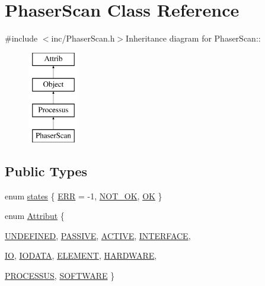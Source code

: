 \hypertarget{classPhaserScan}{
\section{PhaserScan Class Reference}
\label{classPhaserScan}
}


{\ttfamily \#include $<$inc/PhaserScan.h$>$}Inheritance diagram for PhaserScan::\begin{figure}[H]
\begin{center}
\leavevmode
\includegraphics[height=4cm]{classPhaserScan}
\end{center}
\end{figure}
\subsection*{Public Types}
\begin{DoxyCompactItemize}
\item 
enum \hyperlink{classProcessus_a36278773bd98f2d5612fea40c7774821}{states} \{ \hyperlink{classProcessus_a36278773bd98f2d5612fea40c7774821adaf73ad5d0a09f952d0f18dbbe1c7493}{ERR} = -\/1, 
\hyperlink{classProcessus_a36278773bd98f2d5612fea40c7774821a629082f49d6e8df6b6da2b8fbb9d80fb}{NOT\_\-OK}, 
\hyperlink{classProcessus_a36278773bd98f2d5612fea40c7774821af77c64124fa175f28200166fff165ea2}{OK}
 \}
\item 
enum \hyperlink{classAttrib_a69e171d7cc6417835a5a306d3c764235}{Attribut} \{ \par
\hyperlink{classAttrib_a69e171d7cc6417835a5a306d3c764235a3a8da2ab97dda18aebab196fe4100531}{UNDEFINED}, 
\hyperlink{classAttrib_a69e171d7cc6417835a5a306d3c764235a2bfb2af57b87031d190a05fe25dd92ed}{PASSIVE}, 
\hyperlink{classAttrib_a69e171d7cc6417835a5a306d3c764235a3b1fec929c0370d1436f2f06e298fb0d}{ACTIVE}, 
\hyperlink{classAttrib_a69e171d7cc6417835a5a306d3c764235aa27c16b480a369ea4d18b07b2516bbc7}{INTERFACE}, 
\par
\hyperlink{classAttrib_a69e171d7cc6417835a5a306d3c764235a1420a5b8c0540b2af210b6975eded7f9}{IO}, 
\hyperlink{classAttrib_a69e171d7cc6417835a5a306d3c764235a0af3b0d0ac323c1704e6c69cf90add28}{IODATA}, 
\hyperlink{classAttrib_a69e171d7cc6417835a5a306d3c764235a7788bc5dd333fd8ce18562b269c9dab1}{ELEMENT}, 
\hyperlink{classAttrib_a69e171d7cc6417835a5a306d3c764235a61ceb22149f365f1780d18f9d1459423}{HARDWARE}, 
\par
\hyperlink{classAttrib_a69e171d7cc6417835a5a306d3c764235a75250e29692496e73effca2c0330977f}{PROCESSUS}, 
\hyperlink{classAttrib_a69e171d7cc6417835a5a306d3c764235a103a67cd0b8f07ef478fa45d4356e27b}{SOFTWARE}
 \}
\end{DoxyCompactItemize}
